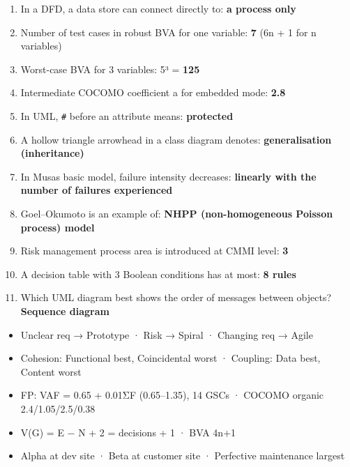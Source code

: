 \begin{enumerate}
\def\labelenumi{\arabic{enumi}.}
\setcounter{enumi}{50}
\tightlist
\item
  In a DFD, a data store can connect directly to: \textbf{a process only}
\item
  Number of test cases in robust BVA for one variable: \textbf{7} (6n + 1 for n variables)
\item
  Worst-case BVA for 3 variables: 5³ = \textbf{125}
\item
  Intermediate COCOMO coefficient a for embedded mode: \textbf{2.8}
\item
  In UML, \texttt{\#} before an attribute means: \textbf{protected}
\item
  A hollow triangle arrowhead in a class diagram denotes: \textbf{generalisation (inheritance)}
\item
  In Musa\textquotesingle s basic model, failure intensity decreases: \textbf{linearly with the number of failures experienced}
\item
  Goel--Okumoto is an example of: \textbf{NHPP (non-homogeneous Poisson process) model}
\item
  Risk management process area is introduced at CMMI level: \textbf{3}
\item
  A decision table with 3 Boolean conditions has at most: \textbf{8 rules}
\item
  Which UML diagram best shows the order of messages between objects? \textbf{Sequence diagram}
\end{enumerate}

\begin{revbox}

\begin{itemize}
\tightlist
\item
  Unclear req → Prototype · Risk → Spiral · Changing req → Agile
\item
  Cohesion: Functional best, Coincidental worst · Coupling: Data best, Content worst
\item
  FP: VAF = 0.65 + 0.01ΣF (0.65--1.35), 14 GSCs · COCOMO organic 2.4/1.05/2.5/0.38
\item
  V(G) = E − N + 2 = decisions + 1 · BVA 4n+1
\item
  Alpha at dev site · Beta at customer site · Perfective maintenance largest
\end{itemize}

\end{revbox}
